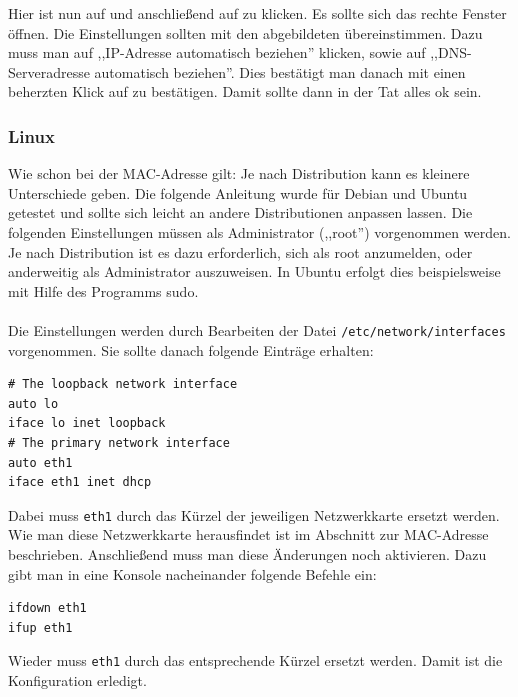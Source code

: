 Hier ist nun auf  und anschließend
auf  zu klicken. Es sollte sich das rechte Fenster
öffnen. 
Die Einstellungen sollten mit den abgebildeten
übereinstimmen. Dazu muss man auf ,,IP-Adresse automatisch beziehen''
klicken, sowie auf ,,DNS-Serveradresse automatisch beziehen''. Dies
bestätigt man danach mit einen beherzten Klick auf  zu bestätigen. Damit sollte dann in der
Tat alles ok sein.

\subsubsection{Linux}
\small{Wie schon bei der MAC-Adresse gilt: Je nach Distribution kann es kleinere Unterschiede
geben. Die folgende Anleitung wurde für Debian und Ubuntu getestet und
sollte sich leicht an andere Distributionen anpassen lassen.}
Die folgenden Einstellungen müssen als Administrator (,,root'') vorgenommen
werden. Je nach Distribution ist es dazu erforderlich, sich als root
anzumelden, oder anderweitig als Administrator auszuweisen. In Ubuntu
erfolgt dies beispielsweise mit Hilfe des Programms sudo.\\\\
Die Einstellungen werden durch Bearbeiten der Datei
\texttt{/etc/network/interfaces} vorgenommen. Sie sollte danach
folgende Einträge erhalten:
\begin{verbatim}
# The loopback network interface
auto lo 
iface lo inet loopback
# The primary network interface
auto eth1
iface eth1 inet dhcp 
\end{verbatim}
Dabei muss \texttt{eth1} durch das Kürzel der jeweiligen Netzwerkkarte
ersetzt werden. Wie man diese Netzwerkkarte herausfindet ist im
Abschnitt zur MAC-Adresse beschrieben. Anschließend muss man diese
Änderungen noch aktivieren. Dazu gibt man in eine Konsole nacheinander
folgende Befehle ein:
\begin{verbatim}
ifdown eth1
ifup eth1
\end{verbatim}
Wieder muss \texttt{eth1} durch das entsprechende Kürzel ersetzt
werden. Damit ist die Konfiguration erledigt.

